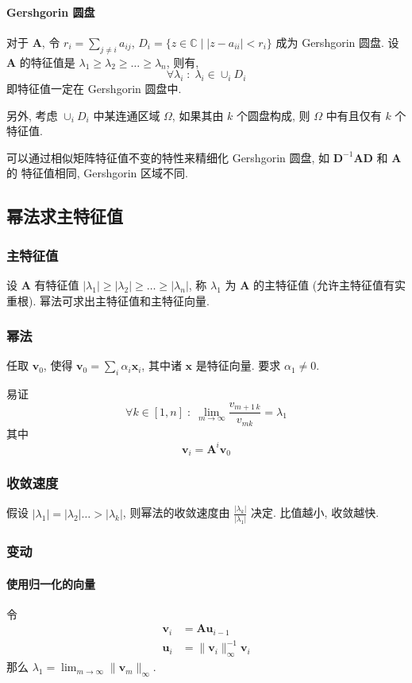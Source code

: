 \documentclass{ctexart}
\newcommand{\Cset}{\mathbb{C}}
\begin{document}
\paragraph{Gershgorin 圆盘}
    对于 $\mathbf{A}$, 令 $r_i = \sum_{j \neq i} a_{ij}$,
    $D_i = \{z \in \Cset \;|\; |z - a_{ii}| < r_i\}$ 成为 Gershgorin 圆盘.
    设 $\mathbf{A}$ 的特征值是 $\lambda_1 \ge \lambda_2 \ge \ldots \ge \lambda_n$,
    则有, \[\forall \lambda_i\;:\; \lambda_i \in \cup_i D_i\]
    即特征值一定在 Gershgorin 圆盘中.\par
    另外, 考虑 $\cup_i D_i$ 中某连通区域 $\Omega$, 如果其由 $k$ 个圆盘构成,
    则 $\Omega$ 中有且仅有 $k$ 个特征值.\par
    可以通过相似矩阵特征值不变的特性来精细化 Gershgorin 圆盘,
    如 $ \mathbf{D}^{-1} \mathbf{A} \mathbf{D} $ 和 $\mathbf{A} $ 的 特征值相同,
    Gershgorin 区域不同.

\subsection{幂法求主特征值}
\subsubsection{主特征值}
    设 $\mathbf{A}$ 有特征值 $|\lambda_1| \ge |\lambda_2| \ge \ldots \ge |\lambda_n|$,
    称 $\lambda_1$ 为 $\mathbf{A}$ 的主特征值 (允许主特征值有实重根). 幂法可求出主特征值和主特征向量.
\subsubsection{幂法}
    任取 $\mathbf{v}_0$, 使得 $\mathbf{v}_0 = \sum_i \alpha_i \mathbf{x}_i$, 其中诸 $\mathbf{x}$ 是特征向量.
    要求 $\alpha_1 \neq 0$.\par
    易证 \[
        \forall k \in [1,n]\;:\; \lim_{m\to\infty} \frac{v_{m+1\,k}}{v_{mk}} = \lambda_1\]
    其中 \[ \mathbf{v}_i = \mathbf{A}^i \mathbf{v}_0 \]
\subsubsection{收敛速度}
    假设 $|\lambda_1| = |\lambda_2| \ldots > |\lambda_k|$, 则幂法的收敛速度由 $\frac{|\lambda_k|}{|\lambda_1|}$ 决定.
    比值越小, 收敛越快.
\subsubsection{变动}
\paragraph{使用归一化的向量}
    令\begin{align*}
        \mathbf{v}_i &= \mathbf{A} \mathbf{u}_{i-1}\\
        \mathbf{u}_i &= \|\mathbf{v}_i\|_{\infty}^{-1} \mathbf{v}_i
    \end{align*}
    那么 $\lambda_1 = \lim_{m\to\infty} \| \mathbf{v}_m \|_{\infty}$.
\end{document}
